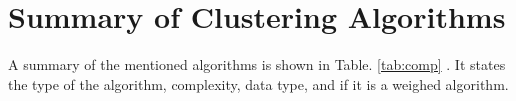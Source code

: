 \documentclass[../report.tex]{subfiles}
\begin{document}







\section{Summary of Clustering Algorithms}
A summary of the mentioned algorithms is shown in Table. \ref{tab:comp}
. It states the type of the algorithm, complexity, data type, and if it is a weighed algorithm.
\end{document}
